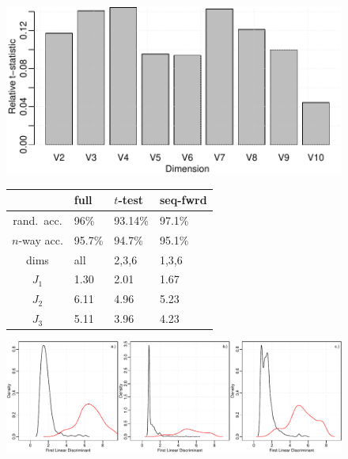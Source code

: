 \begin{figure}[H]
  \begin{minipage}[b]{0.45\linewidth}
    \includegraphics[width=\linewidth]{images/tumor_ttest.pdf}
  \end{minipage}
  \hfill
  \quad
  \begin{minipage}[b]{0.45\linewidth}
    \centering
    \begin{tabular}[b]{c|lll}
      & \textbf{full} & \textbf{$t$-test} & \textbf{seq-fwrd} \\
      \hline
      rand.~acc.   & 96\%   & 93.14\% & 97.1\% \\ 
      $n$-way acc. & 95.7\% & 94.7\%  & 95.1\% \\
      dims         & all    & 2,3,6   & 1,3,6 \\
      $J_1$        & 1.30   & 2.01    & 1.67 \\
      $J_2$        & 6.11   & 4.96    & 5.23 \\
      $J_3$        & 5.11   & 3.96    & 4.23 \\
    \end{tabular}
    \vspace{5mm}
  \end{minipage}
  \hfill
  \vspace{5mm}
  \quad
  \begin{minipage}[t]{1.00\linewidth}
    \includegraphics[width=\linewidth]{images/tumor.pdf}
  \end{minipage}

\end{figure}
